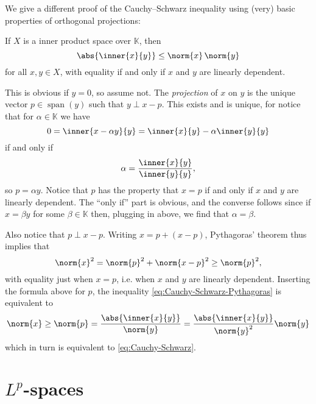 \documentclass[article, a4paper, 11pt, oneside]{memoir}
\numberwithin{equation}{chapter}
\newcommand{\bbK}{\mathbb{K}}
\DeclareMathOperator{\Span}{span}
\newenvironment{displaytheorem}{%
	\begin{displayquote}\itshape%
}{%
	\end{displayquote}%
}
\theoremstyle{nonumberplain}
\begin{document}
\begin{remark}
	We give a different proof of the Cauchy--Schwarz inequality using (very) basic properties of orthogonal projections:
	\begin{displaytheorem}
		If $X$ is a inner product space over $\bbK$, then
		\begin{equation}
			\label{eq:Cauchy-Schwarz}
			\abs{ \inner{x}{y} }
				\leq \norm{x} \, \norm{y}
		\end{equation}
		for all $x,y \in X$, with equality if and only if $x$ and $y$ are linearly dependent.
	\end{displaytheorem}
	This is obvious if $y = 0$, so assume not. The \emph{projection} of $x$ on $y$ is the unique vector $p \in \Span(y)$ such that $y \perp x - p$. This exists and is unique, for notice that for $\alpha \in \bbK$ we have
	\begin{equation*}
		0
			= \inner{x - \alpha y}{y}
			= \inner{x}{y} - \alpha \inner{y}{y}
	\end{equation*}
	if and only if
	\begin{equation*}
		\alpha
			= \frac{ \inner{x}{y} }{ \inner{y}{y} },
	\end{equation*}
	so $p = \alpha y$. Notice that $p$ has the property that $x = p$ if and only if $x$ and $y$ are linearly dependent. The \enquote{only if} part is obvious, and the converse follows since if $x = \beta y$ for some $\beta \in \bbK$ then, plugging in above, we find that $\alpha = \beta$.

	Also notice that $p \perp x - p$. Writing $x = p + (x - p)$, Pythagoras' theorem thus implies that
	\begin{equation}
		\label{eq:Cauchy-Schwarz-Pythagoras}
		\norm{x}^2
			= \norm{p}^2 + \norm{x - p}^2
			\geq \norm{p}^2,
	\end{equation}
	with equality just when $x = p$, i.e. when $x$ and $y$ are linearly dependent. Inserting the formula above for $p$, the inequality \cref{eq:Cauchy-Schwarz-Pythagoras} is equivalent to
	\begin{equation*}
		\norm{x}
			\geq \norm{p}
			= \frac{ \abs{\inner{x}{y}} }{ \norm{y} }
			= \frac{ \abs{\inner{x}{y}} }{ \norm{y}^2 } \norm{y}
	\end{equation*}
	which in turn is equivalent to \cref{eq:Cauchy-Schwarz}.
\end{remark}

\chapter{$L^p$-spaces}
\end{document}

